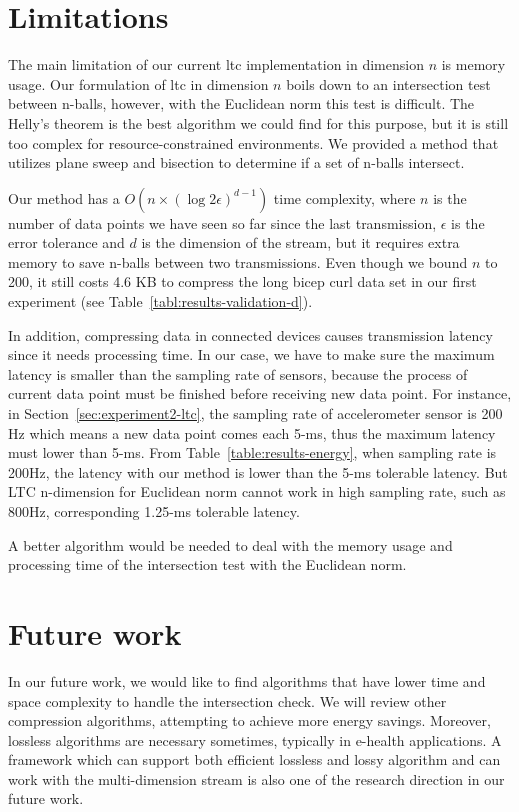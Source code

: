 \section{Limitations}


The main limitation of our current \acrshort{ltc} implementation in
dimension $n$ is memory usage. Our formulation of \acrshort{ltc} in
dimension $n$ boils down to an intersection test between n-balls, however,
with the Euclidean norm this test is difficult. The Helly's theorem is the
best algorithm we could find for this purpose, but it is still too complex
for resource-constrained environments. We provided a method that utilizes
plane sweep and bisection to determine if a set of n-balls intersect.

Our method has a $O(n\times (\log{2\epsilon})^{d-1})$ time complexity, where $n$
is the number of data points we have seen so far since the last transmission,
$\epsilon$ is the error tolerance and $d$ is the dimension of the stream, but it
requires extra memory to save n-balls between two transmissions. Even though we
bound $n$ to 200, it still costs 4.6 KB to compress the long bicep curl data set
in our first experiment (see Table~\ref{tabl:results-validation-d}).

In addition, compressing data in connected devices causes transmission latency
since it needs processing time. In our case, we have to make sure the maximum
latency is smaller than the sampling rate of sensors, because the process of
current data point must be finished before receiving new data point. For
instance, in Section~\ref{sec:experiment2-ltc}, the sampling rate of
accelerometer sensor is 200 Hz which means a new data point comes each 5-ms,
thus the maximum latency must lower than 5-ms. From
Table~\ref{table:results-energy}, when sampling rate is 200Hz, the latency with
our method is lower than the 5-ms tolerable latency. But LTC n-dimension for
Euclidean norm cannot work in high sampling rate, such as 800Hz, corresponding
1.25-ms tolerable latency.

A better algorithm would be needed to deal
with the memory usage and processing time of the intersection test with the
Euclidean norm.


\section{Future work}

In our future work, we would like to find algorithms that have lower time and
space complexity to handle the intersection check. We will review other
compression algorithms, attempting to achieve more energy savings. Moreover, 
lossless algorithms are necessary sometimes, typically in e-health applications. 
A framework which can support both efficient lossless and lossy algorithm and
can work with the multi-dimension stream is also one of the research
direction in our future work.
